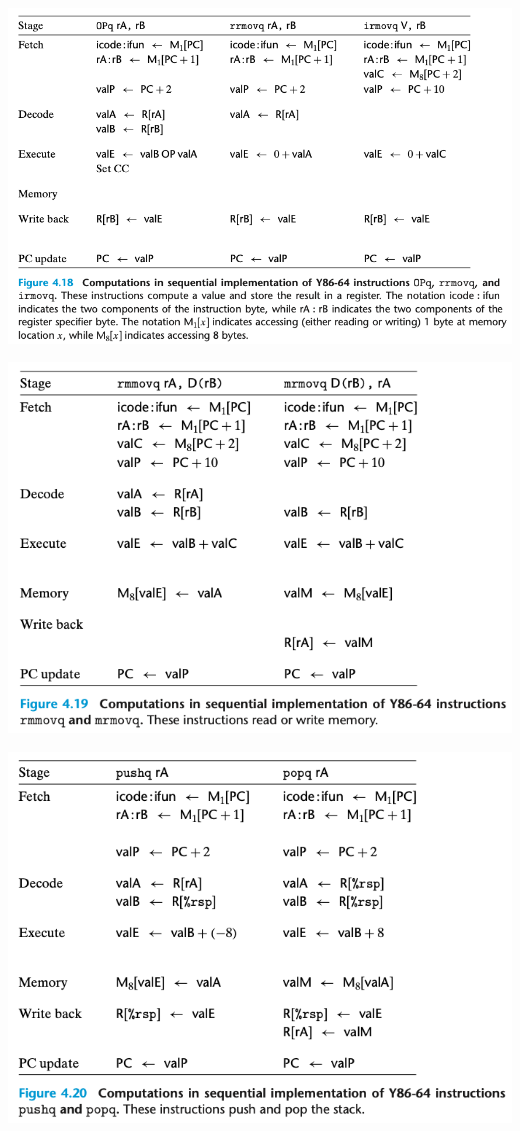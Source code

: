\documentclass[11pt]{article}
\begin{document}
\begin{center}
\includegraphics[width=.9\linewidth]{pics/figure4.18-computations-in-sequential-implementation-of-y86-64-instructions-opq-rrmovq-irmovq.png}
\end{center}

\begin{center}
\includegraphics[width=.9\linewidth]{pics/figure4.19-computations-in-sequential-implementation-of-y86-64-instructions-rmmovq-mrmovq.png}
\end{center}

\begin{center}
\includegraphics[width=.9\linewidth]{pics/figure4.20-computations-in-sequential-implementation-of-y86-64-instructions-pushq-popq.png}
\end{center}
\end{document}
